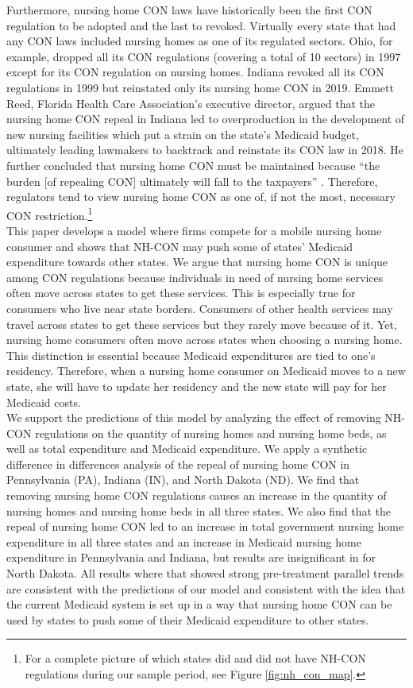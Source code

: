 \documentclass[../Main.tex]{subfiles}
\begin{document}
\indent Furthermore, nursing home CON laws have historically been the first CON regulation to be adopted and the last to revoked. Virtually every state that had any CON laws included nursing homes as one of its regulated sectors. Ohio, for example, dropped all its CON regulations (covering a total of 10 sectors) in 1997 except for its CON regulation on nursing homes. Indiana revoked all its CON regulations in 1999 but reinstated only its nursing home CON in 2019. Emmett Reed, Florida Health Care Association’s executive director, argued that the nursing home CON repeal in Indiana led to overproduction in the development of new nursing facilities which put a strain on the state’s Medicaid budget, ultimately leading lawmakers to backtrack and reinstate its CON law in 2018. He further concluded that nursing home CON must be maintained because “the burden [of repealing CON] ultimately will fall to the taxpayers” \citep{sexton2019conrepeal}. Therefore, regulators tend to view nursing home CON as one of, if not the most, necessary CON restriction.\footnote{For a complete picture of which states did and did not have NH-CON regulations during our sample period, see Figure \ref{fig:nh_con_map}.}\\
\indent This paper develops a model where firms compete for a mobile nursing home consumer and shows that NH-CON may push some of states’ Medicaid expenditure towards other states. We argue that nursing home CON is unique among CON regulations because individuals in need of nursing home services often move across states to get these services. This is especially true for consumers who live near state borders. Consumers of other health services may travel across states to get these services but they rarely move because of it. Yet, nursing home consumers often move across states when choosing a nursing home. This distinction is essential because Medicaid expenditures are tied to one's residency. Therefore, when a nursing home consumer on Medicaid moves to a new state, she will have to update her residency and the new state will pay for her Medicaid costs.\\
\indent We support the predictions of this model by analyzing the effect of removing NH-CON regulations on the quantity of nursing homes and nursing home beds, as well as total expenditure and Medicaid expenditure. We apply a synthetic difference in differences analysis of the repeal of nursing home CON in Pennsylvania (PA), Indiana (IN), and North Dakota (ND). We find that removing nursing home CON regulations causes an increase in the quantity of nursing homes and nursing home beds in all three states. We also find that the repeal of nursing home CON led to an increase in total government nursing home expenditure in all three states and an increase in Medicaid nursing home expenditure in Pennsylvania and Indiana, but results are insignificant in for North Dakota. All results where that showed strong pre-treatment parallel trends are consistent with the predictions of our model and consistent with the idea that the current Medicaid system is set up in a way that nursing home CON can be used by states to push some of their Medicaid expenditure to other states. \\
\end{document}
